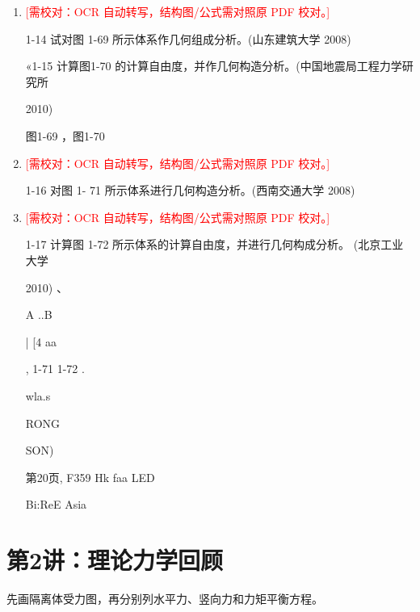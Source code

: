 \documentclass[UTF8,12pt,a4paper,openany]{ctexbook}
\newcommand{\TODO}[1]{\textcolor{red}{[需校对：#1]}}
\begin{document}
\begin{enumerate}[label=\textbf{\arabic*.},leftmargin=2em]
\item \TODO{OCR 自动转写，结构图/公式需对照原 PDF 校对。}\par 1-14 试对图 1-69 所示体系作几何组成分析。(山东建筑大学 2008)\par «1-15 计算图1-70 的计算自由度，并作几何构造分析。(中国地震局工程力学研究所\par 2010)\par 图1-69                               ，图1-70
\item \TODO{OCR 自动转写，结构图/公式需对照原 PDF 校对。}\par 1-16 对图 1- 71 所示体系进行几何构造分析。(西南交通大学 2008)
\item \TODO{OCR 自动转写，结构图/公式需对照原 PDF 校对。}\par 1-17 计算图 1-72 所示体系的计算自由度，并进行几何构成分析。 (北京工业大学\par 2010)                                                                        、\par A              ..B\par | [4     aa\par , 1-71 1-72                            .\par wla.s\par RONG\par SON)\par 第20页, F359 Hk                                 faa LED\par Bi:ReE Asia
\end{enumerate}
\chapter{第2讲：理论力学回顾}
\begin{tcolorbox}[title=解析总览]
先画隔离体受力图，再分别列水平力、竖向力和力矩平衡方程。
\end{tcolorbox}
\end{document}
